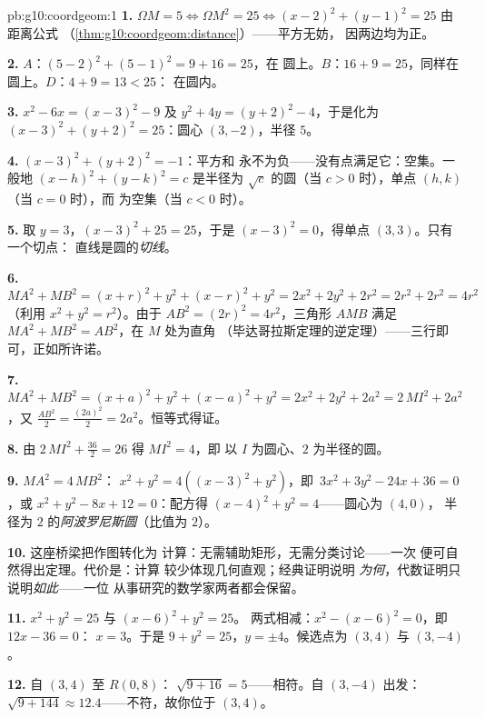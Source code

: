 \begin{solution}{pb:g10:coordgeom:1}
\textbf{1.} $\Omega M = 5 \iff \Omega M^2 = 25 \iff
(x - 2)^2 + (y - 1)^2 = 25$ 由距离公式
（\cref{thm:g10:coordgeom:distance}）——平方无妨，
因两边均为正。

\textbf{2.} $A$：$(5-2)^2 + (5-1)^2 = 9 + 16 = 25$，在
圆上。$B$：$16 + 9 = 25$，同样在圆上。$D$：$4 + 9 = 13 < 25$：
在圆内。

\textbf{3.} $x^2 - 6x = (x - 3)^2 - 9$ 及
$y^2 + 4y = (y + 2)^2 - 4$，于是化为
$(x - 3)^2 + (y + 2)^2 = 25$：圆心 $(3, -2)$，半径 $5$。

\textbf{4.} $(x - 3)^2 + (y + 2)^2 = -1$：平方和
永不为负——没有点满足它：空集。一般地
$(x - h)^2 + (y - k)^2 = c$ 是半径为
$\sqrt c$ 的圆（当 $c > 0$ 时），单点 $(h, k)$（当 $c = 0$ 时），而
为空集（当 $c < 0$ 时）。

\textbf{5.} 取 $y = 3$，$(x - 3)^2 + 25 = 25$，于是
$(x - 3)^2 = 0$，得单点 $(3, 3)$。只有一个切点：
直线是圆的\emph{切线}。

\textbf{6.} $MA^2 + MB^2 = (x + r)^2 + y^2 + (x - r)^2 + y^2
= 2x^2 + 2y^2 + 2r^2 = 2r^2 + 2r^2 = 4r^2$（利用
$x^2 + y^2 = r^2$）。由于 $AB^2 = (2r)^2 = 4r^2$，三角形
$AMB$ 满足 $MA^2 + MB^2 = AB^2$，在 $M$ 处为直角
（毕达哥拉斯定理的逆定理）——三行即可，正如所许诺。

\textbf{7.} $MA^2 + MB^2 = (x + a)^2 + y^2 + (x - a)^2 + y^2
= 2x^2 + 2y^2 + 2a^2 = 2\,MI^2 + 2a^2$，又
$\frac{AB^2}{2} = \frac{(2a)^2}{2} = 2a^2$。恒等式得证。

\textbf{8.} 由 $2\,MI^2 + \frac{36}{2} = 26$ 得 $MI^2 = 4$，即
以 $I$ 为圆心、$2$ 为半径的圆。

\textbf{9.} $MA^2 = 4\,MB^2$：
$x^2 + y^2 = 4\left((x - 3)^2 + y^2\right)$，即\
$3x^2 + 3y^2 - 24x + 36 = 0$，或
$x^2 + y^2 - 8x + 12 = 0$：配方得
$(x - 4)^2 + y^2 = 4$——圆心为 $(4, 0)$，
半径为 $2$ 的\emph{阿波罗尼斯圆}（比值为 $2$）。

\textbf{10.} 这座桥梁把作图转化为
计算：无需辅助矩形，无需分类讨论——一次
便可自然得出定理。代价是：计算
较少体现几何直观；经典证明说明
\emph{为何}，代数证明只说明\emph{如此}——一位
从事研究的数学家两者都会保留。

\textbf{11.} $x^2 + y^2 = 25$ 与 $(x - 6)^2 + y^2 = 25$。
两式相减：$x^2 - (x - 6)^2 = 0$，即\ $12x - 36 = 0$：
$x = 3$。于是 $9 + y^2 = 25$，$y = \pm 4$。候选点为
$(3, 4)$ 与 $(3, -4)$。

\textbf{12.} 自 $(3, 4)$ 至 $R(0, 8)$：
$\sqrt{9 + 16} = 5$——相符。自 $(3, -4)$ 出发：
$\sqrt{9 + 144} \approx 12.4$——不符，故你位于 $(3, 4)$。


\end{solution}

